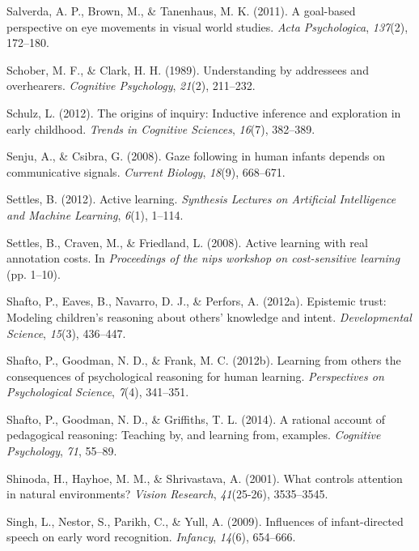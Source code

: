 \documentclass[oneside]{report}
\begin{document}
\hypertarget{ref-salverda2011goal}{}
Salverda, A. P., Brown, M., \& Tanenhaus, M. K. (2011). A goal-based
perspective on eye movements in visual world studies. \emph{Acta
Psychologica}, \emph{137}(2), 172--180.

\hypertarget{ref-schober1989understanding}{}
Schober, M. F., \& Clark, H. H. (1989). Understanding by addressees and
overhearers. \emph{Cognitive Psychology}, \emph{21}(2), 211--232.

\hypertarget{ref-schulz2012origins}{}
Schulz, L. (2012). The origins of inquiry: Inductive inference and
exploration in early childhood. \emph{Trends in Cognitive Sciences},
\emph{16}(7), 382--389.

\hypertarget{ref-senju2008gaze}{}
Senju, A., \& Csibra, G. (2008). Gaze following in human infants depends
on communicative signals. \emph{Current Biology}, \emph{18}(9),
668--671.

\hypertarget{ref-settles2012active}{}
Settles, B. (2012). Active learning. \emph{Synthesis Lectures on
Artificial Intelligence and Machine Learning}, \emph{6}(1), 1--114.

\hypertarget{ref-settles2008active}{}
Settles, B., Craven, M., \& Friedland, L. (2008). Active learning with
real annotation costs. In \emph{Proceedings of the nips workshop on
cost-sensitive learning} (pp. 1--10).

\hypertarget{ref-shafto2012epistemic}{}
Shafto, P., Eaves, B., Navarro, D. J., \& Perfors, A. (2012a). Epistemic
trust: Modeling children's reasoning about others' knowledge and intent.
\emph{Developmental Science}, \emph{15}(3), 436--447.

\hypertarget{ref-shafto2012learning}{}
Shafto, P., Goodman, N. D., \& Frank, M. C. (2012b). Learning from
others the consequences of psychological reasoning for human learning.
\emph{Perspectives on Psychological Science}, \emph{7}(4), 341--351.

\hypertarget{ref-shafto2014rational}{}
Shafto, P., Goodman, N. D., \& Griffiths, T. L. (2014). A rational
account of pedagogical reasoning: Teaching by, and learning from,
examples. \emph{Cognitive Psychology}, \emph{71}, 55--89.

\hypertarget{ref-shinoda2001controls}{}
Shinoda, H., Hayhoe, M. M., \& Shrivastava, A. (2001). What controls
attention in natural environments? \emph{Vision Research},
\emph{41}(25-26), 3535--3545.

\hypertarget{ref-singh2009influences}{}
Singh, L., Nestor, S., Parikh, C., \& Yull, A. (2009). Influences of
infant-directed speech on early word recognition. \emph{Infancy},
\emph{14}(6), 654--666.
\end{document}
